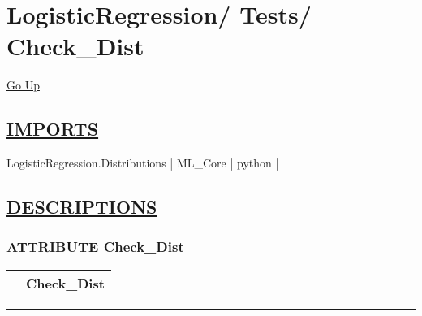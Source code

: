 \chapter*{\color{headfile}
{\large LogisticRegression\slash\hspace{0pt}}
{\large Tests\slash\hspace{0pt}}
 \\
Check_Dist
}
\hypertarget{ecldoc:toc:LogisticRegression.Tests.Check_Dist}{}
\hyperlink{ecldoc:toc:root/LogisticRegression/Tests}{Go Up}

\section*{\underline{\textsf{IMPORTS}}}
\begin{doublespace}
{\large
LogisticRegression.Distributions |
ML\_Core |
python |
}
\end{doublespace}

\section*{\underline{\textsf{DESCRIPTIONS}}}
\subsection*{\textsf{\colorbox{headtoc}{\color{white} ATTRIBUTE}
Check\_Dist}}

\hypertarget{ecldoc:logisticregression.tests.check_dist}{}

{\renewcommand{\arraystretch}{1.5}
\begin{tabularx}{\textwidth}{|>{\raggedright\arraybackslash}l|X|}
\hline
\hspace{0pt}\mytexttt{\color{red} } & \textbf{Check\_Dist} \\
\hline
\end{tabularx}
}

\par


\rule{\linewidth}{0.5pt}
